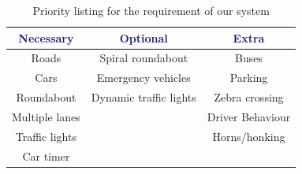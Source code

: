 \documentclass{article}
\begin{document}



\begin{table}[h] 
	\centering
	\label{PriorityListing}
	\begin{tabular}{|c|c|c|}
		\hline \rule{0pt}{2.5ex}
		\textcolor{MidnightBlue}{\bf Necessary}      & \textcolor{MidnightBlue}{\bf Optional} & \textcolor{MidnightBlue}{\bf Extra}   \\ \hline \rule{0pt}{2.5ex}
		Roads & Spiral roundabout & Buses  \\ 
		Cars & Emergency vehicles & Parking \\ 
		Roundabout & Dynamic traffic lights & Zebra crossing \\ 
		Multiple lanes & & Driver Behaviour  \\
		Traffic lights & & Horns/honking \\
		Car timer  & & \\ \hline 
	\end{tabular}
	\caption{Priority listing for the requirement of our system}
	\label{requirements}
	
\end{table}
\end{document}
